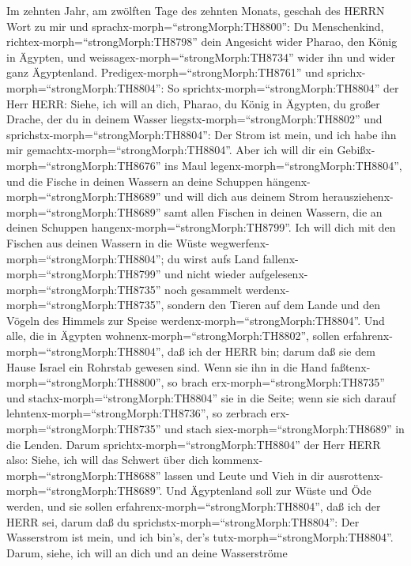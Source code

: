  Im zehnten Jahr, am zwölften Tage des zehnten Monats,
geschah des HERRN Wort zu mir und sprachx-morph=``strongMorph:TH8800'':
 Du Menschenkind, richtex-morph=``strongMorph:TH8798'' dein
Angesicht wider Pharao, den König in Ägypten, und
weissagex-morph=``strongMorph:TH8734'' wider ihn und wider ganz
Ägyptenland.  Predigex-morph=``strongMorph:TH8761'' und
sprichx-morph=``strongMorph:TH8804'': So
sprichtx-morph=``strongMorph:TH8804'' der Herr HERR: Siehe, ich will an
dich, Pharao, du König in Ägypten, du großer Drache, der du in deinem
Wasser liegstx-morph=``strongMorph:TH8802'' und
sprichstx-morph=``strongMorph:TH8804'': Der Strom ist mein, und ich habe
ihn mir gemachtx-morph=``strongMorph:TH8804''.  Aber ich
will dir ein Gebißx-morph=``strongMorph:TH8676'' ins Maul
legenx-morph=``strongMorph:TH8804'', und die Fische in deinen Wassern an
deine Schuppen hängenx-morph=``strongMorph:TH8689'' und will dich aus
deinem Strom herausziehenx-morph=``strongMorph:TH8689'' samt allen
Fischen in deinen Wassern, die an deinen Schuppen
hangenx-morph=``strongMorph:TH8799''.  Ich will dich mit den
Fischen aus deinen Wassern in die Wüste
wegwerfenx-morph=``strongMorph:TH8804''; du wirst aufs Land
fallenx-morph=``strongMorph:TH8799'' und nicht wieder
aufgelesenx-morph=``strongMorph:TH8735'' noch gesammelt
werdenx-morph=``strongMorph:TH8735'', sondern den Tieren auf dem Lande
und den Vögeln des Himmels zur Speise
werdenx-morph=``strongMorph:TH8804''.  Und alle, die in
Ägypten wohnenx-morph=``strongMorph:TH8802'', sollen
erfahrenx-morph=``strongMorph:TH8804'', daß ich der HERR bin; darum daß
sie dem Hause Israel ein Rohrstab gewesen sind.  Wenn sie
ihn in die Hand faßtenx-morph=``strongMorph:TH8800'', so brach
erx-morph=``strongMorph:TH8735'' und stachx-morph=``strongMorph:TH8804''
sie in die Seite; wenn sie sich darauf
lehntenx-morph=``strongMorph:TH8736'', so zerbrach
erx-morph=``strongMorph:TH8735'' und stach
siex-morph=``strongMorph:TH8689'' in die Lenden.  Darum
sprichtx-morph=``strongMorph:TH8804'' der Herr HERR also: Siehe, ich
will das Schwert über dich kommenx-morph=``strongMorph:TH8688'' lassen
und Leute und Vieh in dir ausrottenx-morph=``strongMorph:TH8689''.
 Und Ägyptenland soll zur Wüste und Öde werden, und sie
sollen erfahrenx-morph=``strongMorph:TH8804'', daß ich der HERR sei,
darum daß du sprichstx-morph=``strongMorph:TH8804'': Der Wasserstrom ist
mein, und ich bin's, der's tutx-morph=``strongMorph:TH8804''.
 Darum, siehe, ich will an dich und an deine Wasserströme
